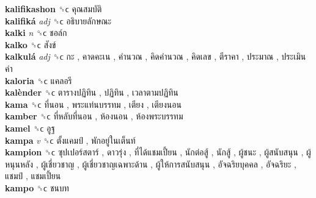 \textbf{kalifikashon} ␝ϲ   คุณสมบัติ   \\
\textbf{kalifiká} \emph{adj}  ␝ϲ   อธิบายลักษณะ   \\
\textbf{kalki} \emph{n}  ␝ϲ   ชอล์ก   \\
\textbf{kalko} ␝ϲ   สังข์   \\
\textbf{kalkulá} \emph{adj}  ␝ϲ   กะ ,  คาดคะเน ,  คำนวณ ,  คิดคำนวณ ,  คิดเลข ,  ตีราคา ,  ประมาณ ,  ประเมินค่า   \\
\textbf{kaloria} ␝ϲ   แคลอรี   \\
\textbf{kalènder} ␝ϲ   ตารางปฏิทิน ,  ปฏิทิน ,  เวลาตามปฏิทิน   \\
\textbf{kama} ␝ϲ   ที่นอน ,  พระแท่นบรรทม ,  เตียง ,  เตียงนอน   \\
\textbf{kamber} ␝ϲ   ที่หลับที่นอน ,  ห้องนอน ,  ห้องพระบรรทม   \\
\textbf{kamel} ␝ϲ   อูฐ   \\
\textbf{kampa} \emph{v}  ␝ϲ   ตั้งแคมป์ ,  พักอยู่ในเต็นท์   \\
\textbf{kampion} ␝ϲ   ซุปเปอร์สตาร์ ,  ดาวรุ่ง ,  ที่ได้แชมเปี้ยน ,  นักต่อสู้ ,  นักสู้ ,  ผู้ชนะ ,  ผู้สนับสนุน ,  ผู้หนุนหลัง ,  ผู้เชี่ยวชาญ ,  ผู้เชี่ยวชาญเฉพาะด้าน ,  ผู้ให้การสนับสนุน ,  อัจฉริยบุคคล ,  อัจฉริยะ ,  แชมป์ ,  แชมเปี้ยน   \\
\textbf{kampo} ␝ϲ   ชนบท   \\
